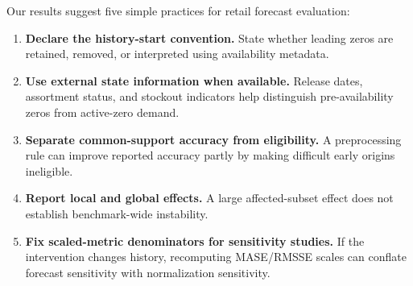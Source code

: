 Our results suggest five simple practices for retail forecast evaluation:
\begin{enumerate}[leftmargin=1.5em]
    \item \textbf{Declare the history-start convention.} State whether leading zeros are retained, removed, or interpreted using availability metadata.
    \item \textbf{Use external state information when available.} Release dates, assortment status, and stockout indicators help distinguish pre-availability zeros from active-zero demand.
    \item \textbf{Separate common-support accuracy from eligibility.} A preprocessing rule can improve reported accuracy partly by making difficult early origins ineligible.
    \item \textbf{Report local and global effects.} A large affected-subset effect does not establish benchmark-wide instability.
    \item \textbf{Fix scaled-metric denominators for sensitivity studies.} If the intervention changes history, recomputing MASE/RMSSE scales can conflate forecast sensitivity with normalization sensitivity.
\end{enumerate}
